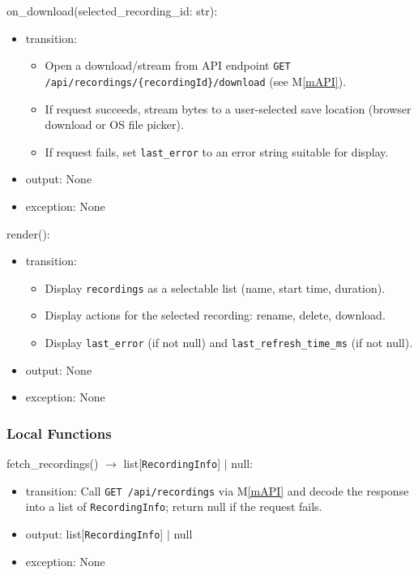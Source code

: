 \documentclass[12pt, titlepage]{article}
\newcommand{\mref}[1]{M\ref{#1}}
\begin{document}
\noindent on\_download(selected\_recording\_id: str):
\begin{itemize}
  \item transition:
        \begin{itemize}
          \item Open a download/stream from API endpoint \texttt{GET
                  /api/recordings/\{recordingId\}/download} (see \mref{mAPI}).
          \item If request succeeds, stream bytes to a user-selected save location (browser
                download or OS file picker).
          \item If request fails, set \texttt{last\_error} to an error string suitable for
                display.
        \end{itemize}
  \item output: None
  \item exception: None
\end{itemize}

\noindent render():
\begin{itemize}
  \item transition:
        \begin{itemize}
          \item Display \texttt{recordings} as a selectable list (name, start time, duration).
          \item Display actions for the selected recording: rename, delete, download.
          \item Display \texttt{last\_error} (if not null) and \texttt{last\_refresh\_time\_ms}
                (if not null).
        \end{itemize}
  \item output: None
  \item exception: None
\end{itemize}

\subsubsection{Local Functions}

\noindent fetch\_recordings() $\rightarrow$ list[\texttt{RecordingInfo}] $|$ null:
\begin{itemize}
  \item transition: Call \texttt{GET /api/recordings} via \mref{mAPI} and decode the
        response into a list of \texttt{RecordingInfo}; return null if the request
        fails.
  \item output: list[\texttt{RecordingInfo}] $|$ null
  \item exception: None
\end{itemize}
\end{document}

